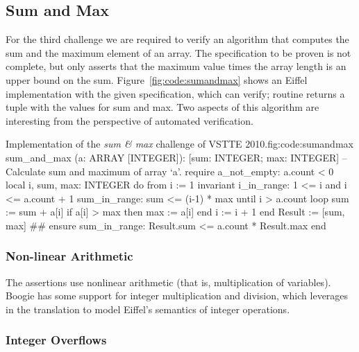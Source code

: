\subsection{Sum and Max}

For the third challenge we are required to verify an algorithm that computes the sum and the maximum element of an array.
The specification to be proven is not complete, but only asserts that the maximum value times the array length is an upper bound on the sum. 
Figure~\ref{fig:code:sumandmax} shows an Eiffel implementation with the given specification, which \AutoProof can verify; routine  returns a tuple with the values for sum and max. Two aspects of this algorithm are interesting from the perspective of automated verification.

\begin{efigure}[!ht]{Implementation of the \emph{sum \& max} challenge of VSTTE 2010.}{fig:code:sumandmax}
sum_and_max (a: ARRAY [INTEGER]): [sum: INTEGER; max: INTEGER]
		-- Calculate sum and maximum of array `a'.
	require
		a_not_empty: a.count < 0
	local
		i, sum, max: INTEGER
	do
		from
			i := 1
		invariant
			i_in_range: 1 <= i and i <= a.count + 1
			sum_in_range: sum <= (i-1) * max
		until
			i > a.count
		loop
			sum := sum + a[i]
			if a[i] > max then
				max := a[i]
			end
			i := i + 1
		end
		Result := [sum, max] #\label{l:sumandmax:new_tuple}#
	ensure
		sum_in_range: Result.sum <= a.count * Result.max
	end
\end{efigure}



\subsubsection{Non-linear Arithmetic}

The assertions use nonlinear arithmetic (that is, multiplication of variables).
Boogie has some support for integer multiplication and division, which \AutoProof leverages in the translation to model Eiffel's semantics of integer operations.


\subsubsection{Integer Overflows}

